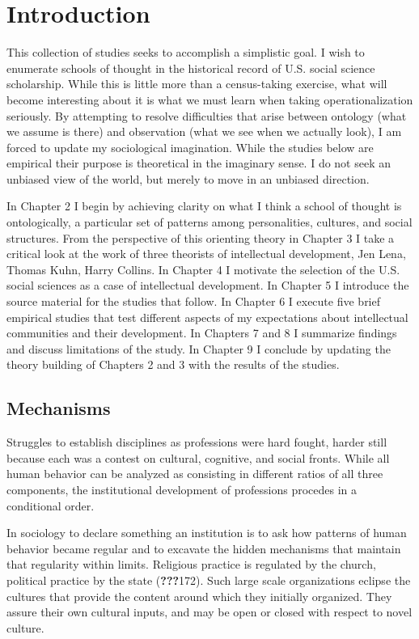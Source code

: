 \section{Introduction}\label{introduction}

This collection of studies seeks to accomplish a simplistic goal. I wish
to enumerate schools of thought in the historical record of U.S. social
science scholarship. While this is little more than a census-taking
exercise, what will become interesting about it is what we must learn
when taking operationalization seriously. By attempting to resolve
difficulties that arise between ontology (what we assume is there) and
observation (what we see when we actually look), I am forced to update
my sociological imagination. While the studies below are empirical their
purpose is theoretical in the imaginary sense. I do not seek an unbiased
view of the world, but merely to move in an unbiased direction.

In Chapter 2 I begin by achieving clarity on what I think a school of
thought is ontologically, a particular set of patterns among
personalities, cultures, and social structures. From the perspective of
this orienting theory in Chapter 3 I take a critical look at the work of
three theorists of intellectual development, Jen Lena, Thomas Kuhn,
Harry Collins. In Chapter 4 I motivate the selection of the U.S. social
sciences as a case of intellectual development. In Chapter 5 I introduce
the source material for the studies that follow. In Chapter 6 I execute
five brief empirical studies that test different aspects of my
expectations about intellectual communities and their development. In
Chapters 7 and 8 I summarize findings and discuss limitations of the
study. In Chapter 9 I conclude by updating the theory building of
Chapters 2 and 3 with the results of the studies.

\subsection{Mechanisms}\label{mechanisms}

Struggles to establish disciplines as professions were hard fought,
harder still because each was a contest on cultural, cognitive, and
social fronts. While all human behavior can be analyzed as consisting in
different ratios of all three components, the institutional development
of professions procedes in a conditional order.

In sociology to declare something an institution is to ask how patterns
of human behavior became regular and to excavate the hidden mechanisms
that maintain that regularity within limits. Religious practice is
regulated by the church, political practice by the state
({\textbf{???}}172). Such large scale organizations eclipse the cultures
that provide the content around which they initially organized. They
assure their own cultural inputs, and may be open or closed with respect
to novel culture.

